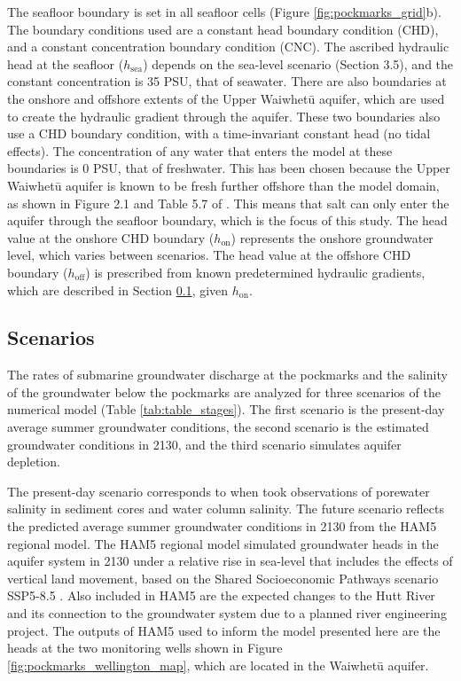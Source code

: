 \documentclass[pdflatex,sn-apa]{sn-jnl}%
\begin{document}
The seafloor boundary is set in all seafloor cells (Figure \ref{fig:pockmarks_grid}b).
The boundary conditions used are a constant head boundary condition (CHD), and a constant concentration boundary condition (CNC).
The ascribed hydraulic head at the seafloor ($h_{\mathrm{sea}}$) depends on the sea-level scenario (Section 3.5), and the constant concentration is 35 PSU, that of seawater.
There are also boundaries at the onshore and offshore extents of the Upper Waiwhetū aquifer, which are used to create the hydraulic gradient through the aquifer.
These two boundaries also use a CHD boundary condition, with a time-invariant constant head (no tidal effects).
The concentration of any water that enters the model at these boundaries is 0 PSU, that of freshwater.
This has been chosen because the Upper Waiwhetū aquifer is known to be fresh further offshore than the model domain,
as shown in Figure 2.1 and Table 5.7 of \cite{gyopari_wellington_2018}.
This means that salt can only enter the aquifer through the seafloor boundary, which is the focus of this study.
The head value at the onshore CHD boundary ($h_{\mathrm{on}}$) represents the onshore groundwater level, which varies between scenarios.
The head value at the offshore CHD boundary ($h_{\mathrm{off}}$) is prescribed from known predetermined hydraulic gradients,
which are described in Section \ref{scenarios}, given $h_{\mathrm{on}}$.

\subsection{Scenarios}\label{scenarios}
The rates of submarine groundwater discharge at the pockmarks and the salinity of the groundwater below the pockmarks are analyzed for three scenarios of the numerical model (Table \ref{tab:table_stages}).
The first scenario is the present-day average summer groundwater conditions, the second scenario is the estimated groundwater conditions in 2130,
and the third scenario simulates aquifer depletion.

The present-day scenario corresponds to when \cite{hoffmann_fresh_2023} took observations of porewater salinity in sediment cores and water column salinity.
The future scenario reflects the predicted average summer groundwater conditions in 2130 from the HAM5 regional model.
The HAM5 regional model simulated groundwater heads in the aquifer system in 2130 under a relative rise in sea-level that includes the effects of vertical land movement,
based on the Shared Socioeconomic Pathways scenario SSP5-8.5 \citep{bennett_hutt_2024}.
Also included in HAM5 are the expected changes to the Hutt River and its connection to the groundwater system due to a planned river engineering project.
The outputs of HAM5 used to inform the model presented here are the heads at the two monitoring wells shown in Figure \ref{fig:pockmarks_wellington_map},
which are located in the Waiwhetū aquifer.
\end{document}

